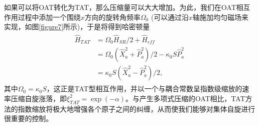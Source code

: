 如果可以将OAT转化为TAT，那么压缩量可以大大增加\cite{PhysRevLett.107.013601}。为此，我们在OAT相互作用过程中添加一个围绕$x$方向的旋转角频率$\Omega_0$ \cite{PhysRevA.92.063610,PhysRevA.87.051801,PhysRevA.91.053826}(可以通过沿$x$轴施加均匀磁场来实现，如图\ref{figure7}所示)，于是将得到哈密顿量
\begin{align}\label{eq4420}
\begin{split}
\hat H_{TAT}&=\Omega_0\hat H_{SR}/2+\hat H_{eff}\\
            &=\Omega_0(\hat X_a^2+\hat P_a^2)/2-\kappa_0 S\hat P_a^2\\
            &=\kappa_0S(\hat X_a^2-\hat P_a^2)/2,
\end{split}
\end{align}
其中$\Omega_0=\kappa_0S$，这正是TAT型相互作用\cite{PRA1993Kitagawa}，并以一个与耦合常数呈指数级缩放的速率压缩自旋涨落，即$\xi^2_{TAT}=\exp(-\alpha)$。与产生多项式压缩的OAT相比，TAT方法的指数缩放将极大地增强各个原子之间的纠缠，从而使我们能够对集体自旋进行很重要的控制。

\vbox{}
